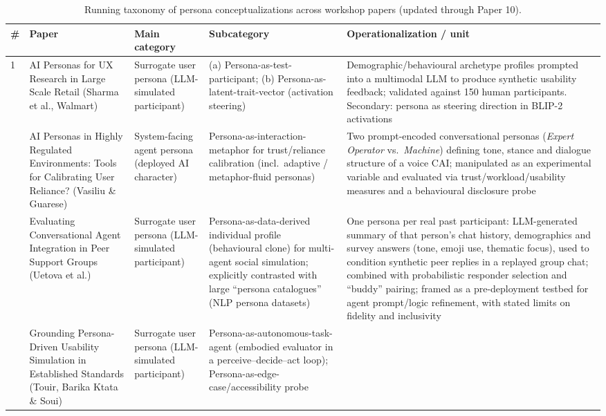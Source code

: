 \begin{table}[t]
\centering
\caption{Running taxonomy of persona conceptualizations across workshop papers (updated through Paper 10).}
\label{tab:persona-taxonomy}
\small
\begin{tabular}{p{0.5cm} p{3.6cm} p{3.4cm} p{3.6cm} p{3.6cm}}
\toprule
\textbf{\#} & \textbf{Paper} & \textbf{Main category} & \textbf{Subcategory} & \textbf{Operationalization / unit} \\
\midrule
1 & AI Personas for UX Research in Large Scale Retail (Sharma et al., Walmart) &
Surrogate user persona (LLM-simulated participant) &
(a) Persona-as-test-participant; (b) Persona-as-latent-trait-vector (activation steering) &
Demographic/behavioural archetype profiles prompted into a multimodal LLM to produce synthetic usability feedback; validated against 150 human participants. Secondary: persona as steering direction in BLIP-2 activations \\
\addlinespace
2 & AI Personas in Highly Regulated Environments: Tools for Calibrating User Reliance? (Vasiliu \& Guarese) &
System-facing agent persona (deployed AI character) &
Persona-as-interaction-metaphor for trust/reliance calibration (incl.\ adaptive / metaphor-fluid personas) &
Two prompt-encoded conversational personas (\textit{Expert Operator} vs.\ \textit{Machine}) defining tone, stance and dialogue structure of a voice CAI; manipulated as an experimental variable and evaluated via trust/workload/usability measures and a behavioural disclosure probe \\
\addlinespace
3 & Evaluating Conversational Agent Integration in Peer Support Groups (Uetova et al.) &
Surrogate user persona (LLM-simulated participant) &
Persona-as-data-derived individual profile (behavioural clone) for multi-agent social simulation; explicitly contrasted with large ``persona catalogues'' (NLP persona datasets) &
One persona per real past participant: LLM-generated summary of that person's chat history, demographics and survey answers (tone, emoji use, thematic focus), used to condition synthetic peer replies in a replayed group chat; combined with probabilistic responder selection and ``buddy'' pairing; framed as a pre-deployment testbed for agent prompt/logic refinement, with stated limits on fidelity and inclusivity \\
\addlinespace
4 & Grounding Persona-Driven Usability Simulation in Established Standards (Touir, Barika Ktata \& Soui) &
Surrogate user persona (LLM-simulated participant) &
Persona-as-autonomous-task-agent (embodied evaluator in a perceive--decide--act loop); Persona-as-edge-case/accessibility probe &

\end{tabular}
\end{table}
